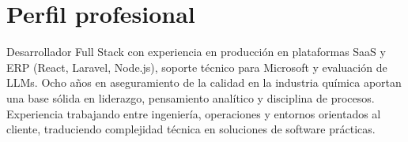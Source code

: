

\section{Perfil profesional}
\vspace{2pt}

\small{
Desarrollador Full Stack con experiencia en producción en plataformas SaaS y ERP (React, Laravel, Node.js), soporte técnico para Microsoft y evaluación de LLMs. Ocho años en aseguramiento de la calidad en la industria química aportan una base sólida en liderazgo, pensamiento analítico y disciplina de procesos. Experiencia trabajando entre ingeniería, operaciones y entornos orientados al cliente, traduciendo complejidad técnica en soluciones de software prácticas.
}

\vspace{8pt}
